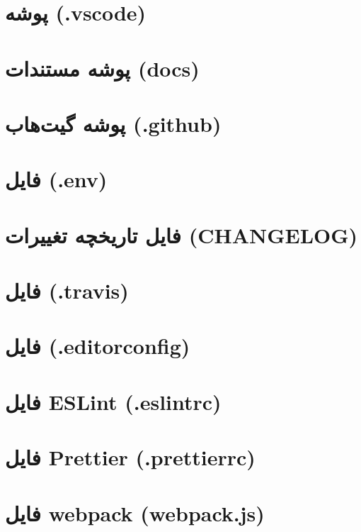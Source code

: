 \section{پوشه  (.vscode)}


\section{پوشه مستندات (docs)}


\section{پوشه گیت‌هاب (.github)}


\section{فایل  (.env)}


\section{فایل تاریخچه تغییرات (CHANGELOG)}


\section{فایل  (.travis)}


\section{فایل  (.editorconfig)}


\section{فایل ESLint (.eslintrc)}


\section{فایل Prettier (.prettierrc)}


\section{فایل webpack (webpack.js)}


